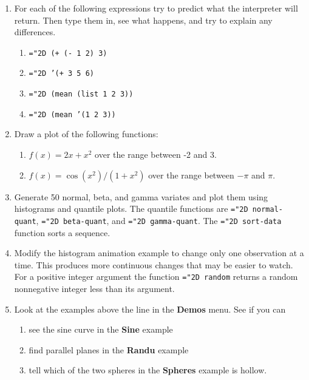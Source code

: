

\newcommand{\dcode}[1]{{\tt \hyphenchar\tentt="2D #1\hyphenchar\tentt=-1}}



\begin{enumerate}
\item
For each of the following expressions try to predict what the interpreter
will return. Then type them in, see what happens, and try to explain any
differences.
\begin{enumerate}
\item \dcode{(+ (- 1 2) 3)}
\item \dcode{'(+ 3 5 6)}
\item \dcode{(mean (list 1 2 3))}
\item \dcode{(mean '(1 2 3))}
\end{enumerate}

\item
Draw a plot of the following functions:
\begin{enumerate}
\item
$f(x) = 2x + x^{2}$ over the range between -2 and 3.
\item
$f(x) = \cos(x^{2})/(1+x^{2})$ over the range between $-\pi$ and $\pi$.
\end{enumerate}

\item
Generate 50 normal, beta, and gamma variates and plot them using
histograms and quantile plots. The quantile functions are
\dcode{normal-quant}, \dcode{beta-quant}, and \dcode{gamma-quant}.
The \dcode{sort-data} function sorts a sequence.

\item
Modify the histogram animation example to change only one observation
at a time. This produces more continuous changes that may be easier to
watch. For a positive integer argument the function \dcode{random}
returns a random nonnegative integer less than its argument.

\item
Look at the examples above the line in the {\bf Demos} menu.
See if you can
\begin{enumerate}
\item see the sine curve in the {\bf Sine} example
\item find parallel planes in the {\bf Randu} example
\item tell which of the two spheres in the {\bf Spheres} example is hollow.
\end{enumerate}
\end{enumerate}

